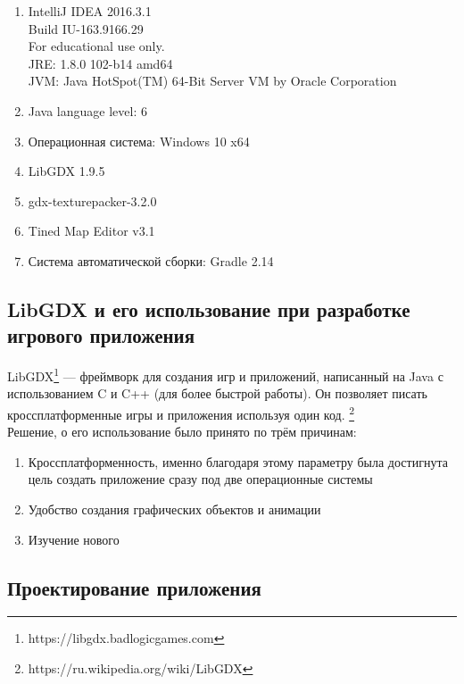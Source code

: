 \begin{enumerate}
\item[•]  IntelliJ IDEA 2016.3.1\\
Build IU-163.9166.29\\
For educational use only.\\
JRE: 1.8.0 102-b14 amd64\\
JVM: Java HotSpot(TM) 64-Bit Server VM by Oracle Corporation\\
\item[•]  Java language level: 6
\item[•]  Операционная система: Windows 10 x64
\item[•]  LibGDX 1.9.5
\item[•]  gdx-texturepacker-3.2.0
\item[•]  Tined Map Editor v3.1
\item[•]  Система автоматической сборки: Gradle 2.14
\end{enumerate}

\subsection{LibGDX и его использование при разработке игрового приложения}

LibGDX\footnote{https://libgdx.badlogicgames.com} — фреймворк для создания игр и приложений, написанный на Java с использованием C и C++ (для более быстрой работы). Он позволяет писать кроссплатформенные игры и приложения используя один код. \footnote{https://ru.wikipedia.org/wiki/LibGDX}\\

Решение, о его использование было принято по трём причинам:
\begin{enumerate}
\item[1]  Кроссплатформенность, именно благодаря этому параметру была достигнута цель создать приложение сразу под две операционные системы
\item[2]  Удобство создания графических объектов и анимации
\item[3]  Изучение нового
\end{enumerate}



\subsection{Проектирование приложения}

